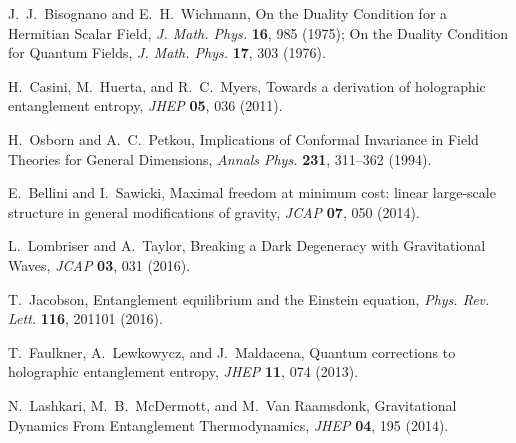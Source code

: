\documentclass[aps,prd,onecolumn,superscriptaddress,nofootinbib]{revtex4-2}
\begin{document}

\begin{thebibliography}{99}

J.~J.~Bisognano and E.~H.~Wichmann,
On the Duality Condition for a Hermitian Scalar Field, \emph{J. Math. Phys.} \textbf{16}, 985 (1975);
On the Duality Condition for Quantum Fields, \emph{J. Math. Phys.} \textbf{17}, 303 (1976).

H.~Casini, M.~Huerta, and R.~C.~Myers,
Towards a derivation of holographic entanglement entropy, \emph{JHEP} \textbf{05}, 036 (2011).

H.~Osborn and A.~C.~Petkou,
Implications of Conformal Invariance in Field Theories for General Dimensions, \emph{Annals Phys.} \textbf{231}, 311–362 (1994).

E.~Bellini and I.~Sawicki,
Maximal freedom at minimum cost: linear large-scale structure in general modifications of gravity, \emph{JCAP} \textbf{07}, 050 (2014).

L.~Lombriser and A.~Taylor,
Breaking a Dark Degeneracy with Gravitational Waves, \emph{JCAP} \textbf{03}, 031 (2016).

T.~Jacobson,
Entanglement equilibrium and the Einstein equation, \emph{Phys. Rev. Lett.} \textbf{116}, 201101 (2016).

T.~Faulkner, A.~Lewkowycz, and J.~Maldacena,
Quantum corrections to holographic entanglement entropy, \emph{JHEP} \textbf{11}, 074 (2013).

N.~Lashkari, M.~B.~McDermott, and M.~Van Raamsdonk,
Gravitational Dynamics From Entanglement Thermodynamics, \emph{JHEP} \textbf{04}, 195 (2014).

\end{thebibliography}
\end{document}
